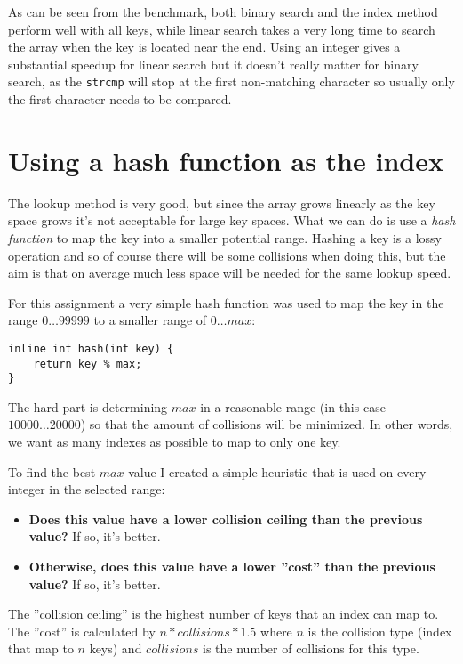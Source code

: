\documentclass[a4paper,11pt]{article}
\begin{document}
As can be seen from the benchmark, both binary search and the index method perform well with all keys,
while linear search takes a very long time to search the array when the key is located near the end.
Using an integer gives a substantial speedup for linear search but it doesn't really matter for binary search,
as the \texttt{strcmp} will stop at the first non-matching character so usually only the first character needs to be compared.

\section*{Using a hash function as the index}

The lookup method is very good, but since the array grows linearly as the key space grows it's not acceptable for large key spaces.
What we can do is use a \emph{hash function} to map the key into a smaller potential range.
Hashing a key is a lossy operation and so of course there will be some collisions when doing this, but the aim is that on average much less space will be needed for the same lookup speed.

For this assignment a very simple hash function was used to map the key in the range $0 \dots 99999$ to a smaller range of $0 \dots max$:

\begin{verbatim}
inline int hash(int key) {
	return key % max;
}
\end{verbatim}

The hard part is determining $max$ in a reasonable range (in this case $10000 \dots 20000$) so that the amount of collisions will be minimized.
In other words, we want as many indexes as possible to map to only one key.

To find the best $max$ value I created a simple heuristic that is used on every integer in the selected range:

\begin{itemize}
	\item \textbf{Does this value have a lower collision ceiling than the previous value?} If so, it's better.
	\item \textbf{Otherwise, does this value have a lower ''cost'' than the previous value?} If so, it's better.
\end{itemize}

The ''collision ceiling'' is the highest number of keys that an index can map to. The ''cost'' is calculated by $n * collisions * 1.5$ where $n$ is the collision type (index that map to $n$ keys) and $collisions$ is the number of collisions for this type.
\end{document}
